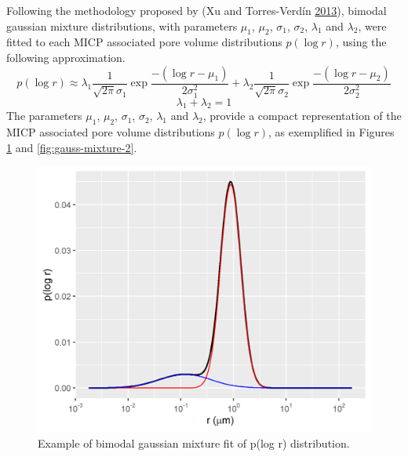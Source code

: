 \documentclass[english,msc,numbers]{coppe}
\begin{document}
  Following the methodology proposed by (Xu and Torres-Verdín \protect\hyperlink{ref-Xu2013}{2013}), bimodal gaussian mixture distributions, with parameters \(\mu_1\), \(\mu_2\), \(\sigma_1\), \(\sigma_2\), \(\lambda_1\) and \(\lambda_2\), were fitted to each MICP associated pore volume distributions \(p(\log{r})\), using the following approximation.
  \begin{equation} 
    p(\log{r}) \approx \lambda_1 \frac{1}{\sqrt{2\pi}\sigma_1}\exp{\frac{-(\log{r}-\mu_1)}{2\sigma_1^2}} + \lambda_2 \frac{1}{\sqrt{2\pi}\sigma_2}\exp{\frac{-(\log{r}-\mu_2)}{2\sigma_2^2}}
    \label{eq:gauss-mixture}
  \end{equation}
  \begin{equation} 
    \lambda_1 + \lambda_2 = 1 
    \label{eq:gauss-mixture-partition}
  \end{equation}
  The parameters \(\mu_1\), \(\mu_2\), \(\sigma_1\), \(\sigma_2\), \(\lambda_1\) and \(\lambda_2\), provide a compact representation of the MICP associated pore volume distributions \(p(\log{r})\), as exemplified in Figures \ref{fig:gauss-mixture-1} and \ref{fig:gauss-mixture-2}.
  \begin{figure}
  
  {\centering \includegraphics[width=0.75\linewidth]{figure/3-2-pchg-gauss-mixture-1} 
  
  }
  
  \caption{Example of bimodal gaussian mixture fit of p(log r) distribution.}\label{fig:gauss-mixture-1}
  \end{figure}
\end{document}
